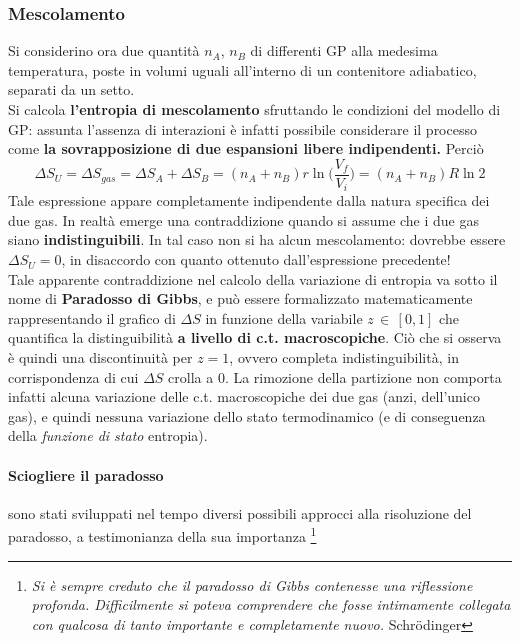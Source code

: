 \documentclass[10pt, oneside]{book}
\begin{document}
\subsubsection{Mescolamento} Si considerino ora due quantità $n_A$, $n_B$ di differenti GP alla medesima temperatura, poste in volumi uguali all'interno di un contenitore adiabatico, separati da un setto.\\
Si calcola \textbf{l'entropia di mescolamento} sfruttando le condizioni del modello di GP: assunta l'assenza di interazioni è infatti possibile considerare il processo come \textbf{la sovrapposizione di due espansioni libere indipendenti.} Perciò
\[\Delta S_U = \Delta S_{gas} = \Delta S_A + \Delta S_B = (n_A + n_B) r \ln \bigg( \frac{V_f}{V_i} \bigg) = (n_A + n_B) R \ln 2\]
Tale espressione appare completamente indipendente dalla natura specifica dei due gas. In realtà emerge una contraddizione quando si assume che i due gas siano \textbf{indistinguibili}. In tal caso non si ha alcun mescolamento: dovrebbe essere $\Delta S_U = 0$, in disaccordo con quanto ottenuto dall'espressione precedente!\\
Tale apparente contraddizione nel calcolo della variazione di entropia va sotto il nome di \textbf{Paradosso di Gibbs}, e può essere formalizzato matematicamente rappresentando il grafico di $\Delta S$ in funzione della variabile $z \, \in \, [0,1]$ che quantifica la distinguibilità \textbf{a livello di c.t. macroscopiche}. Ciò che si osserva è quindi una discontinuità per $z = 1$, ovvero completa indistinguibilità, in corrispondenza di cui $\Delta S$ crolla a $0$. La rimozione della partizione non comporta infatti alcuna variazione delle c.t. macroscopiche dei due gas (anzi, dell'unico gas), e quindi nessuna variazione dello stato termodinamico (e di conseguenza della \textit{funzione di stato} entropia).

\paragraph{Sciogliere il paradosso} sono stati sviluppati nel tempo diversi possibili approcci alla risoluzione del paradosso, a testimonianza della sua importanza \footnote[1]{\textit{Si è sempre creduto che il paradosso di Gibbs contenesse una riflessione profonda. Difficilmente si poteva comprendere che fosse intimamente collegata con qualcosa di tanto importante e completamente nuovo.} Schr\"odinger}
\end{document}
